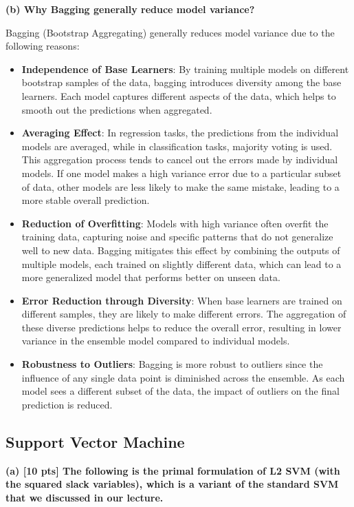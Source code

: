 \textbf{(b) Why Bagging generally reduce model variance?}

Bagging (Bootstrap Aggregating) generally reduces model variance due to the following reasons:

\begin{itemize}
    \item \textbf{Independence of Base Learners}: By training multiple models on different bootstrap samples of the data, bagging introduces diversity among the base learners. Each model captures different aspects of the data, which helps to smooth out the predictions when aggregated.

    \item \textbf{Averaging Effect}: In regression tasks, the predictions from the individual models are averaged, while in classification tasks, majority voting is used. This aggregation process tends to cancel out the errors made by individual models. If one model makes a high variance error due to a particular subset of data, other models are less likely to make the same mistake, leading to a more stable overall prediction.

    \item \textbf{Reduction of Overfitting}: Models with high variance often overfit the training data, capturing noise and specific patterns that do not generalize well to new data. Bagging mitigates this effect by combining the outputs of multiple models, each trained on slightly different data, which can lead to a more generalized model that performs better on unseen data.

    \item \textbf{Error Reduction through Diversity}: When base learners are trained on different samples, they are likely to make different errors. The aggregation of these diverse predictions helps to reduce the overall error, resulting in lower variance in the ensemble model compared to individual models.

    \item \textbf{Robustness to Outliers}: Bagging is more robust to outliers since the influence of any single data point is diminished across the ensemble. As each model sees a different subset of the data, the impact of outliers on the final prediction is reduced.
\end{itemize}

\subsection{Support Vector Machine}
\textbf{(a) [10 pts] The following is the primal formulation of L2 SVM (with the squared slack variables), which is a variant of the standard SVM that we discussed in our lecture. }

